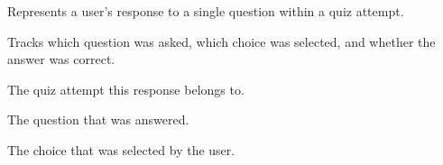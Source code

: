 \documentclass[letterpaper,10pt,english]{sphinxmanual}
\begin{document}
\begin{fulllineitems}
\label{\detokenize{models:QuizResponse}}
\pysigstartsignatures
{}
\pysigstopsignatures
\sphinxAtStartPar
Represents a user’s response to a single question within a quiz attempt.

\sphinxAtStartPar
Tracks which question was asked, which choice was selected, and whether
the answer was correct.

\begin{fulllineitems}
\label{\detokenize{models:QuizResponse.quiz_attempt}}
\pysigstartsignatures
{}
\pysigstopsignatures
\sphinxAtStartPar
The quiz attempt this response belongs to.

\end{fulllineitems}


\begin{fulllineitems}
\label{\detokenize{models:QuizResponse.question}}
\pysigstartsignatures
{}
\pysigstopsignatures
\sphinxAtStartPar
The question that was answered.

\end{fulllineitems}


\begin{fulllineitems}
\label{\detokenize{models:QuizResponse.selected_choice}}
\pysigstartsignatures
{}
\pysigstopsignatures
\sphinxAtStartPar
The choice that was selected by the user.

\end{fulllineitems}



\end{fulllineitems}
\end{document}
